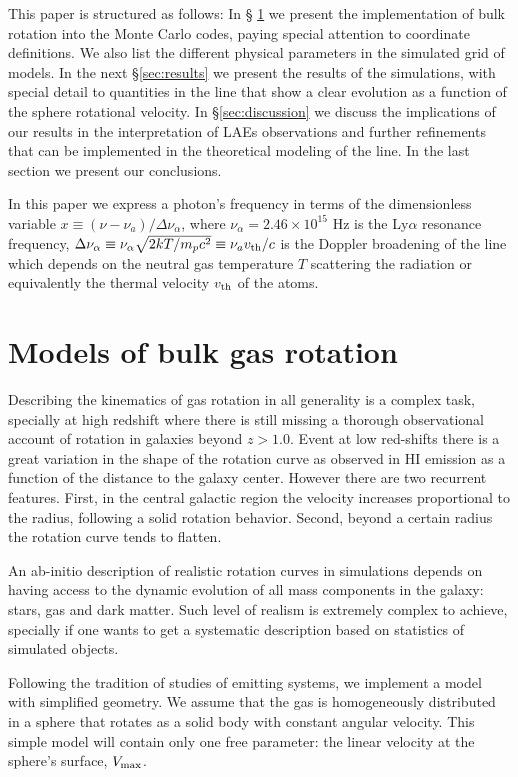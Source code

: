 \documentclass{emulateapj}
\newcommand{\ly}{{\ifmmode{{\rm Ly}\alpha~}\else{Ly$\alpha$~}\fi}}
\begin{document}
 
This paper is structured as follows: In \S
\ref{sec:implementation} we present the implementation of bulk
rotation into the Monte Carlo codes, paying special attention to coordinate
definitions. We also list the different physical parameters in
the simulated grid of models. In the next \S \ref{sec:results} we present the
results of the simulations, with special detail to quantities in the
line that show a clear evolution as a function of the sphere
rotational velocity. In \S \ref{sec:discussion} we discuss the
implications of our results in the interpretation of LAEs
observations and further refinements that can be implemented in the
theoretical modeling of the \ly line. In the last section we present
our conclusions. 

In this paper we express a photon's frequency in terms of the
dimensionless variable $x\equiv (\nu -\nu_a)/\Delta\nu_\alpha$, where
$\nu_{\alpha}=2.46\times 10^{15}$ Hz is the Ly$\alpha$ resonance
frequency,  $\Delta\nu_{\alpha} \equiv
\nu_{\alpha}\sqrt{2kT/m_pc^2}\equiv \nu_av_{\rm th}/c $ is the Doppler
broadening of the line which depends on the neutral gas temperature
$T$ scattering the radiation or equivalently the thermal velocity
$v_{\rm th}$ of the atoms. 


\section{Models of bulk gas rotation}
\label{sec:implementation}

Describing the kinematics of gas rotation in all generality is a
complex task, specially at high redshift where there is still missing
a thorough observational account of rotation in galaxies beyond
$z>1.0$. Event at low red-shifts there is a great
variation in the shape of the rotation curve as observed in HI
emission as a function of the distance to the galaxy center. However
there are two recurrent features. First, in the
central galactic region the velocity increases proportional to the radius,
following a solid rotation behavior. Second, beyond a certain radius
the rotation curve tends to flatten.  

An ab-initio description of realistic rotation curves in simulations
depends on having access to the dynamic evolution of all mass components
in the galaxy: stars, gas and dark matter. Such level of realism is
extremely complex to achieve, specially if one wants to get a
systematic description based on statistics of simulated objects.

Following the tradition of studies of \ly emitting systems,
we implement a model with simplified geometry. We assume that the gas
is homogeneously distributed in a sphere that rotates as a solid body
with constant angular velocity. This simple model will contain only
one free parameter: the linear velocity at the sphere's surface, $V_{\rm
  max}$. 
\end{document}
